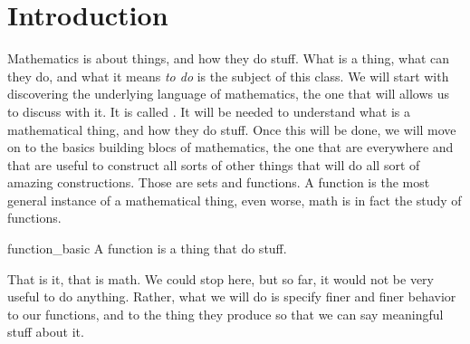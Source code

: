 \section{Introduction}

Mathematics is about things, and how they do stuff. What is a thing, what can they do, and what it means \textit{to do} is the subject of this class. We will start with discovering the underlying language of mathematics, the one that will allows us to discuss with it. It is called . It will be needed to understand what is a mathematical thing, and how they do stuff. Once this will be done, we will move on to the basics building blocs of mathematics, the one that are everywhere and that are useful to construct all sorts of other things that will do all sort of amazing constructions. Those are sets and functions. A function is the most general instance of a mathematical thing, even worse, math is in fact the study of functions. 

\begin{cdef}{}{function_basic}
    A function is a thing that do stuff.
\end{cdef}

That is it, that is math. We could stop here, but so far, it would not be very useful to do anything. Rather, what we will do is specify finer and finer behavior to our functions, and to the thing they produce so that we can say meaningful stuff about it.
